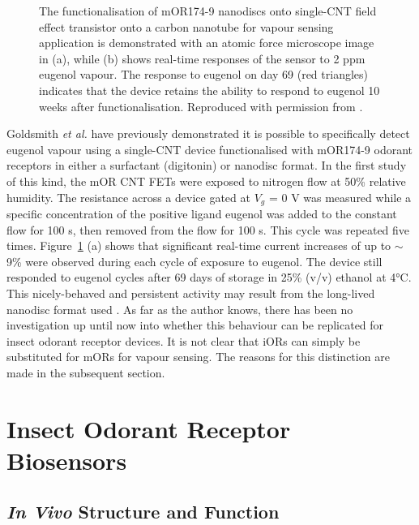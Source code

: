 \documentclass[
  a4paper,
]{scrbook}
\begin{document}
\begin{figure}
\begin{minipage}[t]{0.01\linewidth}
\end{minipage}%

\caption{\label{fig-eugenol-responses}The functionalisation of mOR174-9
nanodiscs onto single-CNT field effect transistor onto a carbon nanotube
for vapour sensing application is demonstrated with an atomic force
microscope image in (a), while (b) shows real-time responses of the
sensor to 2 ppm eugenol vapour. The response to eugenol on day 69 (red
triangles) indicates that the device retains the ability to respond to
eugenol 10 weeks after functionalisation. Reproduced with permission
from \autocite{Goldsmith2011}.}

\end{figure}

Goldsmith \emph{et al.} have previously demonstrated it is possible to
specifically detect eugenol vapour using a single-CNT device
functionalised with mOR174-9 odorant receptors in either a surfactant
(digitonin) or nanodisc format. In the first study of this kind, the mOR
CNT FETs were exposed to nitrogen flow at 50\% relative humidity. The
resistance across a device gated at \(V_g\) = 0 V was measured while a
specific concentration of the positive ligand eugenol was added to the
constant flow for 100 s, then removed from the flow for 100 s. This
cycle was repeated five times. Figure~\ref{fig-eugenol-responses} (a)
shows that significant real-time current increases of up to \(\sim\) 9\%
were observed during each cycle of exposure to eugenol. The device still
responded to eugenol cycles after 69 days of storage in 25\% (v/v)
ethanol at 4°C. This nicely-behaved and persistent activity may result
from the long-lived nanodisc format used \autocite{Goldsmith2011}. As
far as the author knows, there has been no investigation up until now
into whether this behaviour can be replicated for insect odorant
receptor devices. It is not clear that iORs can simply be substituted
for mORs for vapour sensing. The reasons for this distinction are made
in the subsequent section.

\hypertarget{insect-odorant-receptor-biosensors}{%
\section{Insect Odorant Receptor
Biosensors}\label{insect-odorant-receptor-biosensors}}

\hypertarget{in-vivo-structure-and-function-1}{%
\subsection{\texorpdfstring{\emph{In Vivo} Structure and
Function}{In Vivo Structure and Function}}\label{in-vivo-structure-and-function-1}}
\end{document}
